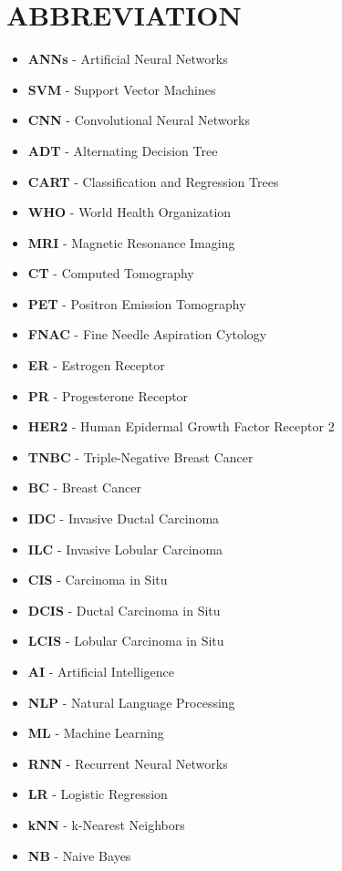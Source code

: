 \documentclass[12pt, twoside]{report}
\begin{document}
	\chapter*{ABBREVIATION}
	\begin{itemize}
		\item \textbf{ANNs} - Artificial Neural Networks 
		\item \textbf{SVM} - Support Vector Machines 
		\item \textbf{CNN} - Convolutional Neural Networks 
		\item \textbf{ADT} - Alternating Decision Tree 
		\item \textbf{CART} - Classification and Regression Trees 
		\item \textbf{WHO} - World Health Organization 
		\item \textbf{MRI} - Magnetic Resonance Imaging 
		\item \textbf{CT} - Computed Tomography 
		\item \textbf{PET} - Positron Emission Tomography 
		\item \textbf{FNAC} - Fine Needle Aspiration Cytology 
		\item \textbf{ER} - Estrogen Receptor 
		\item \textbf{PR} - Progesterone Receptor 
		\item \textbf{HER2} - Human Epidermal Growth Factor Receptor 2 
		\item \textbf{TNBC} - Triple-Negative Breast Cancer 
		\item \textbf{BC} - Breast Cancer 
		\item \textbf{IDC} - Invasive Ductal Carcinoma 
		\item \textbf{ILC} - Invasive Lobular Carcinoma 
		\item \textbf{CIS} - Carcinoma in Situ 
		\item \textbf{DCIS} - Ductal Carcinoma in Situ 
		\item \textbf{LCIS} - Lobular Carcinoma in Situ 
		\item \textbf{AI} - Artificial Intelligence 
		\item \textbf{NLP} - Natural Language Processing 
		\item \textbf{ML} - Machine Learning 
		\item \textbf{RNN} - Recurrent Neural Networks 
		\item \textbf{LR} - Logistic Regression 
		\item \textbf{kNN} - k-Nearest Neighbors 
		\item \textbf{NB} - Naive Bayes 

\end{itemize}
\end{document}
